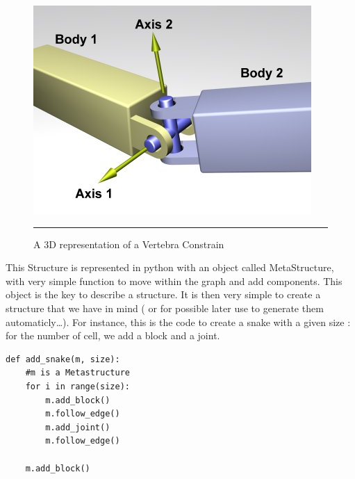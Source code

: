 \begin{figure}[htbp]
    \centering
    \includegraphics[scale=2.0]{Figures/vertebra.jpg}
    \rule{35em}{0.5pt}
    \caption[A Vertebra Constraint]{A 3D representation of a Vertebra Constrain}
    \label{fig:Vertebra}
\end{figure}



This Structure is represented in python with an object called MetaStructure, with very simple function to move within the graph and add components. This object is the key to describe a structure. It is then very simple to create a structure that we have in mind ( or for possible later use to generate them automaticly\ldots). For instance, this is the code to create a snake with a given size : for the number of cell, we add a block and a joint. 

\begin{verbatim}
def add_snake(m, size):
    #m is a Metastructure
    for i in range(size):
        m.add_block()
        m.follow_edge()
        m.add_joint()
        m.follow_edge()
    
    m.add_block()
\end{verbatim}



